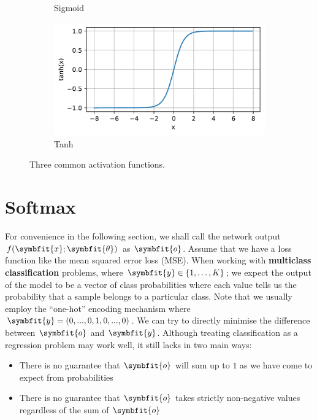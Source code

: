 \begin{figure}[t]
\begin{subfigure}[b]{0.3\textwidth}
         \caption{Sigmoid}
         \label{fig:sigmoid}
     \end{subfigure}
     \hfill
     \begin{subfigure}[b]{0.3\textwidth}
         \centering
         \includegraphics[width=\textwidth]{chapters/assets/tanh.pdf}
         \caption{Tanh}
         \label{fig:tanh}
     \end{subfigure}
        \caption{Three common activation functions.}
        \label{fig:three-activation-funcs}
\end{figure}


\section{Softmax} \label{sec:softmax}
For convenience in the following section, we shall call the network output $f(\symbfit{x}; \symbfit{\theta})$ as $\symbfit{o}$. Assume that we have a loss function like the mean squared error loss (MSE). When working with \textbf{multiclass classification} problems, where \(\symbfit{y} \in \left\{1,\ldots, K \right\}\); we expect the output of the model to be a vector of class probabilities where each value tells us the probability that a sample belongs to a particular class.
Note that we usually employ the ``one-hot'' encoding mechanism where $\symbfit{y} = (0, ... , 0, 1, 0, ... , 0)$.
We can try to directly minimise the difference between $\symbfit{o}$ and $\symbfit{y}$. Although treating classification as a regression problem may work well, it still lacks in two main ways:
\begin{itemize}
    \item There is no guarantee that $\symbfit{o}$ will sum up to $1$ as we have come to expect from probabilities
    \item There is no guarantee that $\symbfit{o}$ takes strictly non-negative values regardless of the sum of $\symbfit{o}$
\end{itemize}


